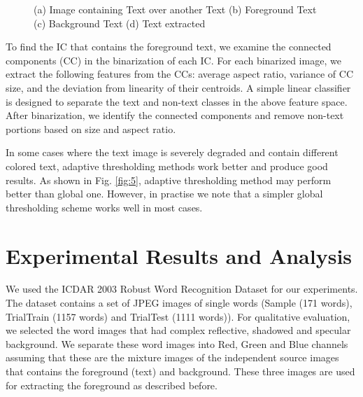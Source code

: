 \begin{figure}[htbp]
\centering
{}
\caption
{(a) Image containing Text over another Text (b) Foreground Text (c) Background Text (d)
Text extracted}
\label{fig:7}
\end{figure}
To find the IC that contains the foreground text, we examine the connected components (CC) in the 
binarization of each IC. For each binarized image, we extract the following features from the CCs: 
average aspect ratio, variance of  CC size, and the deviation from linearity of their centroids.
A simple linear classifier is designed to separate the text and non-text classes in the above feature space.
After binarization, we identify the
connected components and remove non-text portions based on size and aspect ratio.

In some cases where the text image is severely degraded and contain different colored text,
adaptive thresholding methods work better and produce good results. As shown in Fig. \ref{fig:5}, adaptive thresholding
method may perform better than global one. However, in practise we note that a simpler global thresholding
scheme works well in most cases.



\section{Experimental Results and Analysis}

We used the ICDAR 2003 Robust Word Recognition Dataset \cite{A15} for our experiments.
The dataset contains a set of JPEG images of single words (Sample (171 words), 
TrialTrain (1157 words) and TrialTest (1111 words)). For qualitative evaluation,
we selected the word images that had complex reflective, shadowed and specular background.  
We separate these word images into Red, Green and Blue channels
assuming that these are the mixture images of the independent source images
that contains the foreground (text) and background. These three images are used
for extracting the foreground as described before.

